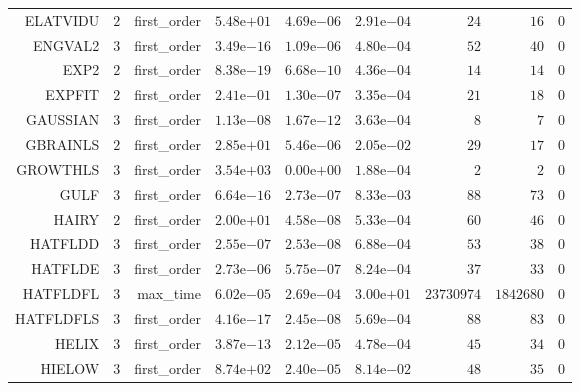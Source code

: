 \begin{longtable}{rrrrrrrrr}
ELATVIDU & \(     2\) & first\_order & \( 5.48\)e\(+01\) & \( 4.69\)e\(-06\) & \( 2.91\)e\(-04\) & \(    24\) & \(    16\) & \(     0\) \\
ENGVAL2 & \(     3\) & first\_order & \( 3.49\)e\(-16\) & \( 1.09\)e\(-06\) & \( 4.80\)e\(-04\) & \(    52\) & \(    40\) & \(     0\) \\
EXP2 & \(     2\) & first\_order & \( 8.38\)e\(-19\) & \( 6.68\)e\(-10\) & \( 4.36\)e\(-04\) & \(    14\) & \(    14\) & \(     0\) \\
EXPFIT & \(     2\) & first\_order & \( 2.41\)e\(-01\) & \( 1.30\)e\(-07\) & \( 3.35\)e\(-04\) & \(    21\) & \(    18\) & \(     0\) \\
GAUSSIAN & \(     3\) & first\_order & \( 1.13\)e\(-08\) & \( 1.67\)e\(-12\) & \( 3.63\)e\(-04\) & \(     8\) & \(     7\) & \(     0\) \\
GBRAINLS & \(     2\) & first\_order & \( 2.85\)e\(+01\) & \( 5.46\)e\(-06\) & \( 2.05\)e\(-02\) & \(    29\) & \(    17\) & \(     0\) \\
GROWTHLS & \(     3\) & first\_order & \( 3.54\)e\(+03\) & \( 0.00\)e\(+00\) & \( 1.88\)e\(-04\) & \(     2\) & \(     2\) & \(     0\) \\
GULF & \(     3\) & first\_order & \( 6.64\)e\(-16\) & \( 2.73\)e\(-07\) & \( 8.33\)e\(-03\) & \(    88\) & \(    73\) & \(     0\) \\
HAIRY & \(     2\) & first\_order & \( 2.00\)e\(+01\) & \( 4.58\)e\(-08\) & \( 5.33\)e\(-04\) & \(    60\) & \(    46\) & \(     0\) \\
HATFLDD & \(     3\) & first\_order & \( 2.55\)e\(-07\) & \( 2.53\)e\(-08\) & \( 6.88\)e\(-04\) & \(    53\) & \(    38\) & \(     0\) \\
HATFLDE & \(     3\) & first\_order & \( 2.73\)e\(-06\) & \( 5.75\)e\(-07\) & \( 8.24\)e\(-04\) & \(    37\) & \(    33\) & \(     0\) \\
HATFLDFL & \(     3\) & max\_time & \( 6.02\)e\(-05\) & \( 2.69\)e\(-04\) & \( 3.00\)e\(+01\) & \(23730974\) & \(1842680\) & \(     0\) \\
HATFLDFLS & \(     3\) & first\_order & \( 4.16\)e\(-17\) & \( 2.45\)e\(-08\) & \( 5.69\)e\(-04\) & \(    88\) & \(    83\) & \(     0\) \\
HELIX & \(     3\) & first\_order & \( 3.87\)e\(-13\) & \( 2.12\)e\(-05\) & \( 4.78\)e\(-04\) & \(    45\) & \(    34\) & \(     0\) \\
HIELOW & \(     3\) & first\_order & \( 8.74\)e\(+02\) & \( 2.40\)e\(-05\) & \( 8.14\)e\(-02\) & \(    48\) & \(    35\) & \(     0\) \\

\end{longtable}
